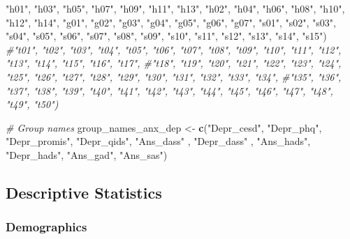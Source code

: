 \documentclass[
]{article}
\newenvironment{Shaded}{\begin{snugshade}}{\end{snugshade}}
\newcommand{\CommentTok}[1]{\textcolor[rgb]{0.56,0.35,0.01}{\textit{#1}}}
\newcommand{\FunctionTok}[1]{\textcolor[rgb]{0.13,0.29,0.53}{\textbf{#1}}}
\newcommand{\NormalTok}[1]{#1}
\newcommand{\OtherTok}[1]{\textcolor[rgb]{0.56,0.35,0.01}{#1}}
\newcommand{\StringTok}[1]{\textcolor[rgb]{0.31,0.60,0.02}{#1}}
\begin{document}
\begin{Shaded}
\begin{Highlighting}[]
\StringTok{"h01"}\NormalTok{, }\StringTok{"h03"}\NormalTok{, }\StringTok{"h05"}\NormalTok{, }\StringTok{"h07"}\NormalTok{, }\StringTok{"h09"}\NormalTok{, }\StringTok{"h11"}\NormalTok{, }\StringTok{"h13"}\NormalTok{, }\StringTok{"h02"}\NormalTok{, }\StringTok{"h04"}\NormalTok{, }\StringTok{"h06"}\NormalTok{, }\StringTok{"h08"}\NormalTok{, }\StringTok{"h10"}\NormalTok{, }\StringTok{"h12"}\NormalTok{, }\StringTok{"h14"}\NormalTok{, }
\StringTok{"g01"}\NormalTok{, }\StringTok{"g02"}\NormalTok{, }\StringTok{"g03"}\NormalTok{, }\StringTok{"g04"}\NormalTok{, }\StringTok{"g05"}\NormalTok{, }\StringTok{"g06"}\NormalTok{, }\StringTok{"g07"}\NormalTok{, }
\StringTok{"s01"}\NormalTok{, }\StringTok{"s02"}\NormalTok{, }\StringTok{"s03"}\NormalTok{, }\StringTok{"s04"}\NormalTok{, }\StringTok{"s05"}\NormalTok{, }\StringTok{"s06"}\NormalTok{, }\StringTok{"s07"}\NormalTok{, }\StringTok{"s08"}\NormalTok{, }\StringTok{"s09"}\NormalTok{, }\StringTok{"s10"}\NormalTok{, }\StringTok{"s11"}\NormalTok{, }\StringTok{"s12"}\NormalTok{, }\StringTok{"s13"}\NormalTok{, }\StringTok{"s14"}\NormalTok{, }\StringTok{"s15"}\NormalTok{)  }
\CommentTok{\#"t01", "t02", "t03", "t04", "t05", "t06", "t07", "t08", "t09", "t10", "t11", "t12", "t13", "t14", "t15", "t16", "t17", \#"t18", "t19", "t20", "t21", "t22", "t23", "t24", "t25", "t26", "t27", "t28", "t29", "t30", "t31", "t32", "t33", "t34", \#"t35", "t36", "t37", "t38", "t39", "t40", "t41", "t42", "t43", "t44", "t45", "t46", "t47", "t48", "t49", "t50")}

\CommentTok{\# Group names}
\NormalTok{group\_names\_anx\_dep }\OtherTok{\textless{}{-}} \FunctionTok{c}\NormalTok{(}\StringTok{"Depr\_cesd"}\NormalTok{, }\StringTok{"Depr\_phq"}\NormalTok{, }\StringTok{"Depr\_promis"}\NormalTok{, }\StringTok{"Depr\_qids"}\NormalTok{, }\StringTok{"Ans\_dass"}\NormalTok{ , }\StringTok{"Depr\_dass"}\NormalTok{ , }\StringTok{"Ans\_hads"}\NormalTok{, }\StringTok{"Depr\_hads"}\NormalTok{, }\StringTok{"Ans\_gad"}\NormalTok{, }\StringTok{"Ans\_sas"}\NormalTok{)}
\end{Highlighting}
\end{Shaded}

\subsection{Descriptive Statistics}\label{descriptive-statistics}

\subsubsection{Demographics}\label{demographics}
\end{document}
